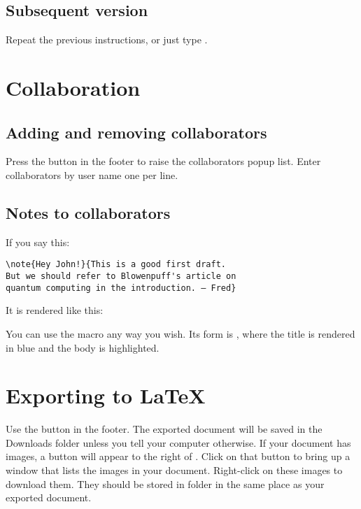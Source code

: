 
\subsection{Subsequent version}

Repeat the previous instructions, or just type .

\section{Collaboration}

\subsection{Adding and removing collaborators}

Press the  button in the footer to raise the collaborators popup list.  Enter collaborators by user name one per line.


\subsection{Notes to collaborators}

If you say this:

\begin{verbatim}
\note{Hey John!}{This is a good first draft.
But we should refer to Blowenpuff's article on
quantum computing in the introduction. — Fred}
\end{verbatim}

It is rendered like this:


You can use the  macro any way you wish.  Its form is , where the title is rendered in blue and the body is highlighted.

\section{Exporting to LaTeX}

Use the  button in the footer.  The exported document will be saved in the Downloads folder unless you tell your computer otherwise.  If your document has images, a button  will appear to the right of .  Click on that button to bring up a window that lists the images in your document.  Right-click on these images to download them.  They should be stored in folder  in the same place as your exported document.



